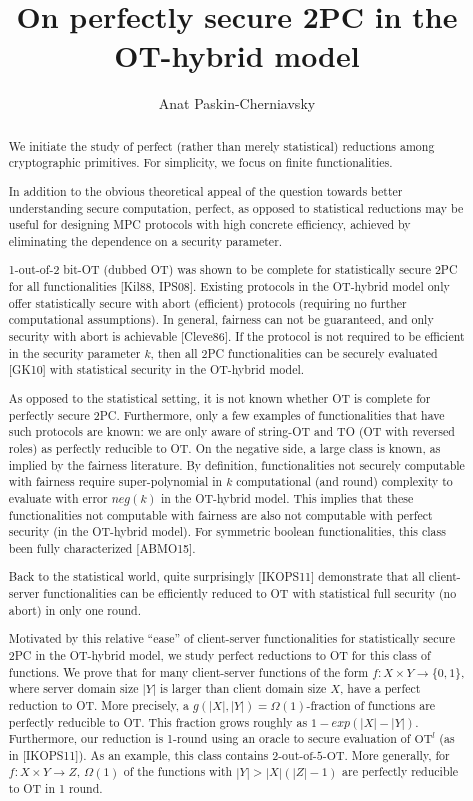 \documentclass[a4paper]{article}
\title{On perfectly secure 2PC in the OT-hybrid model}
\author{Anat Paskin-Cherniavsky}
\begin{document}
\maketitle

\begin{abstract}
We initiate the study of perfect (rather than merely statistical) reductions among cryptographic primitives. For simplicity, we focus on finite functionalities.

In addition to the obvious theoretical appeal of the question towards better understanding secure computation, perfect, as opposed to statistical reductions may be useful for designing MPC protocols with high concrete efficiency, achieved by eliminating the dependence on a security parameter.

1-out-of-2 bit-OT (dubbed OT) was shown to be complete for statistically secure 2PC for all functionalities [Kil88, IPS08]. Existing protocols in the OT-hybrid model only offer statistically secure with abort (efficient) protocols (requiring no further computational assumptions). In general, fairness can not be guaranteed, and only security with abort is achievable [Cleve86]. If the protocol is not required to be efficient in the security parameter $k$, then all 2PC functionalities can be securely evaluated [GK10] with statistical security in the OT-hybrid model.

As opposed to the statistical setting, it is not known whether OT is complete for perfectly secure 2PC. Furthermore, only a few examples of functionalities that have such protocols are known: we are only aware of string-OT and TO (OT with reversed roles) as perfectly reducible to OT.
On the negative side, a large class is known, as implied by the fairness literature. By definition, functionalities not securely computable with fairness require super-polynomial in $k$ 
computational (and round) complexity to evaluate with error $neg(k)$ in the OT-hybrid model. 
This implies that these functionalities not computable with fairness are also not computable with perfect security (in the OT-hybrid model). For symmetric boolean functionalities, this class been fully characterized [ABMO15].

Back to the statistical world, quite surprisingly [IKOPS11] demonstrate that all client-server functionalities can be efficiently reduced to OT with statistical full security (no abort) in only one round.

Motivated by this relative ``ease'' of client-server functionalities for statistically secure 2PC in the OT-hybrid model, we study perfect reductions to OT for this class of functions.
We prove that for many client-server functions of the form $f: X\times Y\rightarrow \{0,1\}$, where server domain size $|Y|$ is larger than client domain size $X$, have a perfect reduction to OT.
More precisely, a $g(|X|,|Y|)=\Omega(1)$-fraction of functions are perfectly reducible to OT. This fraction grows roughly as $1-exp(|X|-|Y|)$.
Furthermore, our reduction is 1-round using an oracle to secure evaluation of ${\text{OT}}^l$ (as in [IKOPS11]). As an example, this class contains $\text{2-out-of-5-OT}$.
More generally, for $f: X\times Y\rightarrow Z$, $\Omega(1)$ of the functions with $|Y|>|X|(|Z|-1)$ are perfectly reducible to OT in 1 round. 


\end{abstract}
\end{document}
